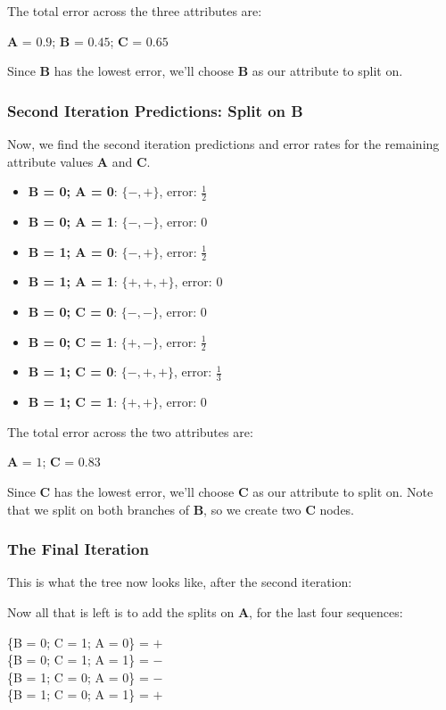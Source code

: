 \documentclass[11pt]{article}
\begin{document}
\noindent The total error across the three attributes are:
\begin{center}
\textbf{A} = $0.9$; \textbf{B} = $0.45$; \textbf{C} = $0.65$
\end{center}
Since \textbf{B} has the lowest error, we'll choose \textbf{B} as our attribute to split on.
\subsubsection{Second Iteration Predictions: Split on B}
Now, we find the second iteration predictions and error rates for the remaining attribute values \textbf{A} and \textbf{C}.
\begin{itemize}
\item \textbf{B = 0; A = 0}: $\{-, +\}$, error: $\frac{1}{2}$
\item \textbf{B = 0; A = 1}: $\{-, -\}$, error: $0$
\item \textbf{B = 1; A = 0}: $\{-, +\}$, error: $\frac{1}{2}$
\item \textbf{B = 1; A = 1}: $\{+, +, +\}$, error: $0$
\item \textbf{B = 0; C = 0}: $\{-, -\}$, error: $0$
\item \textbf{B = 0; C = 1}: $\{+, -\}$, error: $\frac{1}{2}$
\item \textbf{B = 1; C = 0}: $\{-, +, +\}$, error: $\frac{1}{3}$
\item \textbf{B = 1; C = 1}: $\{+, +\}$, error: $0$
\end{itemize}
\noindent The total error across the two attributes are:
\begin{center}
\textbf{A} = $1$; \textbf{C} = $0.83$
\end{center}
Since \textbf{C} has the lowest error, we'll choose \textbf{C} as our attribute to split on. Note that we split on both branches of \textbf{B}, so we create two \textbf{C} nodes.
\subsubsection{The Final Iteration}
This is what the tree now looks like, after the second iteration:
\begin{center}
\end{center}
Now all that is left is to add the splits on \textbf{A}, for the last four sequences:
\begin{center}
\{B = 0; C = 1; A = 0\} = $+$\\
\{B = 0; C = 1; A = 1\} = $-$\\
\{B = 1; C = 0; A = 0\} = $-$\\
\{B = 1; C = 0; A = 1\} = $+$
\end{center}	
\end{document}

